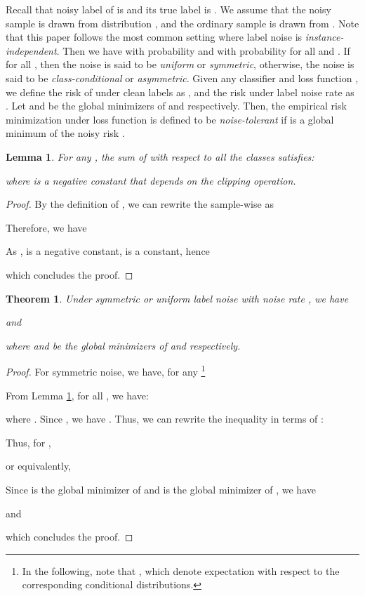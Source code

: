 \documentclass{article}
\newtheorem{theorem}{Theorem}
\newtheorem{lemma}{Lemma}
\begin{document}
Recall that noisy label of  is  and its true label is . We assume that the noisy sample  is drawn from distribution , and the ordinary sample  is drawn from . Note that this paper follows the most common setting where label noise is \emph{instance-independent}. Then we have  with probability  and  with probability  for all  and . If  for all , then the noise is said to be \emph{uniform} or \emph{symmetric}, otherwise, the noise is said to be \emph{class-conditional} or \emph{asymmetric}. Given any classifier  and loss function , we define the risk of  under clean labels as , and the risk under label noise rate  as . Let  and  be the global minimizers of  and  respectively. Then, the empirical risk minimization under loss function  is defined to be \emph{noise-tolerant} if  is a global minimum of the noisy risk .
\begin{lemma}
	\label{lamma2}
	For any , the sum of  with respect to all the classes satisfies:
	
	where  is a negative constant that depends on the clipping operation.
\end{lemma}
\begin{proof}
	By the definition of , we can rewrite the sample-wise  as 
	
	Therefore, we have
	
	As ,  is a negative constant,  is a constant, hence 
	
	which concludes the proof.
\end{proof}


\begin{theorem}
	Under symmetric or uniform label noise with noise rate , we have  
	
	and 
	
	where  and  be the global minimizers of  and  respectively.
\end{theorem}
\begin{proof}
	For symmetric noise, we have, for any  \footnote{In the following, note that , which denote expectation with respect to the corresponding conditional distributions.}
	
	From Lemma \ref{lamma2}, for all , we have:
	
	where . Since , we have . Thus, we can rewrite the inequality in terms of :
	
	Thus, for , 
	
	or equivalently,
	
	
	Since  is the global minimizer of  and   is the global minimizer of , we have 
	
	and 
	
	which concludes the proof.
\end{proof}
\end{document}
